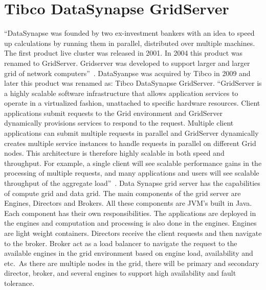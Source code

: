 \section{Tibco DataSynapse GridServer}

``DataSynapse was founded by two ex-investment bankers with an idea to
speed up calculations by running them in parallel, distributed over
multiple machines. The first product live cluster was released in
2001. In 2004 this product was renamed to GridServer. Gridserver was
developed to support larger and larger grid of network
computers''~\cite{hid-sp18-514-datasynapsewiki}. DataSyanpse was
acquired by Tibco in 2009 and later this product was renamed as: Tibco
DataSynapse GridServer\cite{hid-sp18-514-tibcodatasynapsewiki}.
``GridServer is a highly scalable software infrastructure that allows
application services to operate in a virtualized fashion, unattached
to specific hardware resources. Client applications submit requests to
the Grid environment and GridServer dynamically provisions services to
respond to the request. Multiple client applications can submit
multiple requests in parallel and GridServer dynamically creates
multiple service instances to handle requests in parallel on different
Grid nodes. This architecture is therefore highly scalable in both
speed and throughput. For example, a single client will see scalable
performance gains in the processing of multiple requests, and many
applications and users will see scalable throughput of the aggregate
load''~\cite{hid-sp18-514-tibcods}. Data Synapse grid server has the
capabilities of compute grid and data grid. The main components of the
grid server are Engines, Directors and Brokers. All these components
are JVM's built in Java. Each component has their own
responsibilities. The applications are deployed in the engines and
computation and processing is also done in the engines. Engines are
light weight containers. Directors receive the client requests and
then navigate to the broker. Broker act as a load balancer to navigate
the request to the available engines in the grid environment based on
engine load, availability and etc.\ As there are multiple nodes in the
grid, there will be primary and secondary director, broker, and
several engines to support high availability and fault
tolerance\cite{hid-sp18-514-tibcods}.

